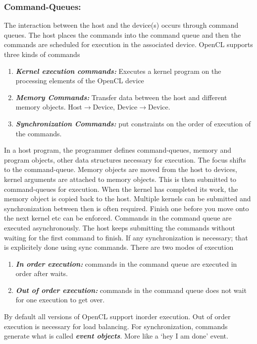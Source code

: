 \documentclass[10pt]{article}
\begin{document}
\vspace{1cm}
{\color{red} \date{13-Nov-2020}}
\subsubsection{Command-Queues:}
The interaction between the host and the device(s) occurs through command queues. The host places the commands into the command queue and then the commands are scheduled for execution in the associated device. OpenCL supports three kinds of commands

\begin{enumerate}
	\item \textit{\textbf{Kernel execution commands:}} Executes a kernel program on the processing elements of the OpenCL device
	\item \textit{\textbf{Memory Commands:}} Transfer data between the host and different memory objects. Host$\rightarrow$Device, Device$\rightarrow$Device.
	\item \textit{\textbf{Synchronization Commands:}} put constraints on the order of execution of the commands.
\end{enumerate}

In a host program, the programmer defines command-queues, memory and program objects, other data structures necessary for execution. The focus shifts to the command-queue. Memory objects are moved from the host to devices, kernel arguments are attached to memory objects. This is then submitted to command-queues for execution. When the kernel has completed its work, the memory object is copied back to the host. Multiple kernels can be submitted and synchronization between then is often required. Finish one before you move onto the next kernel etc can be enforced. Commands in the command queue are executed asynchronously. The host keeps submitting the commands without waiting for the first command to finish. If any synchronization is necessary; that is explicitely done using sync commands. There are two modes of execution

\begin{enumerate}
	\item \textit{\textbf{In order execution:}} commands in the command queue are executed in order after waits.
	\item \textit{\textbf{Out of order execution:}} commands in the command queue does not wait for one execution to get over.
\end{enumerate}

By default all versions of OpenCL support inorder execution. Out of order execution is necessary for load balancing. For synchronization, commands generate what is called \textit{\textbf{event objects}}. More like a `hey I am done' event. 
\end{document}
